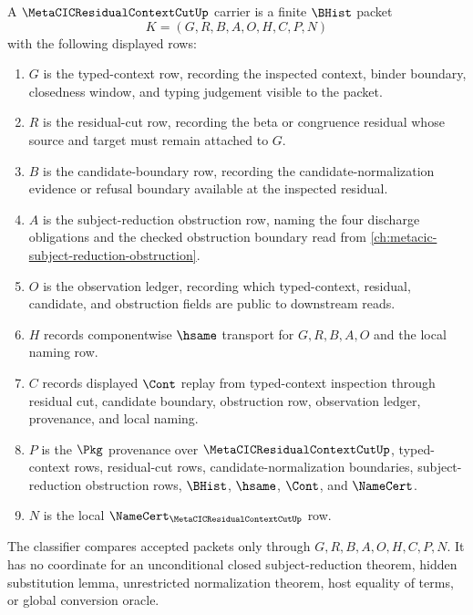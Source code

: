 \begin{definition}
\label{def:metacic-residual-context-cut-carrier}
A $\MetaCICResidualContextCutUp$ carrier is a finite $\BHist$ packet
$$
K=(G,R,B,A,O,H,C,P,N)
$$
with the following displayed rows:
\begin{enumerate}
\item $G$ is the typed-context row, recording the inspected context, binder boundary, closedness window, and typing judgement visible to the packet.
\item $R$ is the residual-cut row, recording the beta or congruence residual whose source and target must remain attached to $G$.
\item $B$ is the candidate-boundary row, recording the candidate-normalization evidence or refusal boundary available at the inspected residual.
\item $A$ is the subject-reduction obstruction row, naming the four discharge obligations and the checked obstruction boundary read from \autoref{ch:metacic-subject-reduction-obstruction}.
\item $O$ is the observation ledger, recording which typed-context, residual, candidate, and obstruction fields are public to downstream reads.
\item $H$ records componentwise $\hsame$ transport for $G,R,B,A,O$ and the local naming row.
\item $C$ records displayed $\Cont$ replay from typed-context inspection through residual cut, candidate boundary, obstruction row, observation ledger, provenance, and local naming.
\item $P$ is the $\Pkg$ provenance over $\MetaCICResidualContextCutUp$, typed-context rows, residual-cut rows, candidate-normalization boundaries, subject-reduction obstruction rows, $\BHist$, $\hsame$, $\Cont$, and $\NameCert$.
\item $N$ is the local $\NameCert_{\MetaCICResidualContextCutUp}$ row.
\end{enumerate}
The classifier compares accepted packets only through $G,R,B,A,O,H,C,P,N$. It has no coordinate for an unconditional closed subject-reduction theorem, hidden substitution lemma, unrestricted normalization theorem, host equality of terms, or global conversion oracle.
\end{definition}


